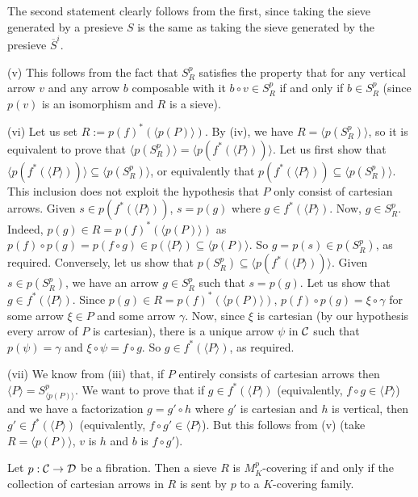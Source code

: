 \documentclass[a4paper,12pt]{article}
\begin{document}
\begin{proofs}
	The second statement clearly follows from the first, since taking the sieve generated by a presieve $S$ is the same as taking the sieve generated by the presieve $\overline{S}^{i}$. 
	
	(v) This follows from the fact that $S^{p}_{R}$ satisfies the property that for any vertical arrow $v$ and any arrow $b$ composable with it $b\circ v\in S^{p}_{R}$ if and only if $b\in S^{p}_{R}$ (since $p(v)$ is an isomorphism and $R$ is a sieve).
	
	(vi) Let us set $R:=p(f)^{\ast}(\langle p(P)\rangle )$. By (iv), we have $R=\langle p(S^{p}_{R})\rangle $, so it is equivalent to prove that $\langle p(S^{p}_{R})\rangle =\langle p(f^{\ast}(\langle P\rangle ))\rangle $. Let us first show that $\langle p(f^{\ast}(\langle P\rangle ))\rangle \subseteq \langle p(S^{p}_{R})\rangle $, or equivalently that $p(f^{\ast}(\langle P\rangle ))\subseteq \langle p(S^{p}_{R})\rangle $. This inclusion does not exploit the hypothesis that $P$ only consist of cartesian arrows. Given $s\in p(f^{\ast}(\langle P\rangle ))$, $s=p(g)$ where $g\in f^{\ast}(\langle P\rangle )$. Now, $g\in S^{p}_{R}$. Indeed, $p(g)\in R=p(f)^{\ast}(\langle p(P)\rangle )$ as $p(f)\circ p(g)=p(f\circ g)\in p(\langle P\rangle )\subseteq \langle p(P)\rangle $. So $g=p(s)\in p(S^{p}_{R})$, as required. Conversely, let us show that $p(S^{p}_{R})\subseteq \langle p(f^{\ast}(\langle P\rangle ))\rangle $. Given $s\in p(S^{p}_{R})$, we have an arrow $g\in S^{p}_{R}$ such that $s=p(g)$. Let us show that $g\in f^{\ast}(\langle P\rangle )$. Since $p(g)\in R=p(f)^{\ast}(\langle p(P)\rangle )$, $p(f)\circ p(g)=\xi\circ \gamma$ for some arrow $\xi\in P$ and some arrow $\gamma$. Now, since $\xi$ is cartesian (by our hypothesis every arrow of $P$ is cartesian), there is a unique arrow $\psi$ in $\cal C$ such that $p(\psi)=\gamma$ and $\xi\circ \psi=f\circ g$. So $g\in f^{\ast}(\langle P\rangle )$, as required.
	
	(vii) We know from (iii) that, if $P$ entirely consists of cartesian arrows then $\langle P\rangle =S^{p}_{\langle p(P)\rangle }$. We want to prove that if $g\in f^{\ast}(\langle P\rangle )$ (equivalently, $f\circ g\in \langle P\rangle $) and we have a factorization $g=g'\circ h$ where $g'$ is cartesian and $h$ is vertical, then $g'\in f^{\ast}(\langle P\rangle )$ (equivalently, $f\circ g'\in \langle P\rangle $). But this follows from (v) (take $R=\langle p(P)\rangle $, $v$ is $h$ and $b$ is $f\circ g'$).   
\end{proofs}

\begin{theorem}\label{thmfibration1}
	Let $p:{\cal C}\to {\cal D}$ be a fibration. Then a sieve $R$ is $M^{p}_{K}$-covering if and only if the collection of cartesian arrows in $R$ is sent by $p$ to a $K$-covering family.
\end{theorem}
\end{document}
